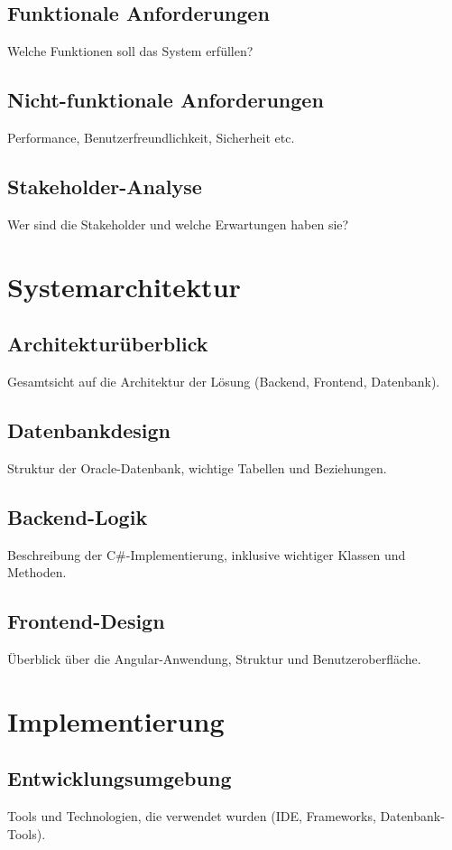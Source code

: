 \documentclass[fontsize=12pt,
parskip=half,	%
department=FakM,  %
twoside, %
DIV=15,BCOR=10mm, %
]{OTHRreprt}
\begin{document}
	\section{Funktionale Anforderungen}
	Welche Funktionen soll das System erfüllen?
	\section{Nicht-funktionale Anforderungen}
	Performance, Benutzerfreundlichkeit, Sicherheit etc.

	\section{Stakeholder-Analyse}
	Wer sind die Stakeholder und welche Erwartungen haben sie?

	\chapter{Systemarchitektur}

	\section{Architekturüberblick}
	Gesamtsicht auf die Architektur der Lösung (Backend, Frontend, Datenbank).

	\section{Datenbankdesign}
	Struktur der Oracle-Datenbank, wichtige Tabellen und Beziehungen.

	\section{Backend-Logik}
	Beschreibung der C\#-Implementierung, inklusive wichtiger Klassen und Methoden.

	\section{Frontend-Design}
	Überblick über die Angular-Anwendung, Struktur und Benutzeroberfläche.


	\chapter{Implementierung}
	
	\section{Entwicklungsumgebung}
	Tools und Technologien, die verwendet wurden (IDE, Frameworks, Datenbank-Tools).
\end{document}

